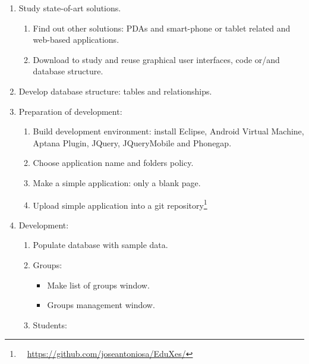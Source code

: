 \documentclass[a4paper]{article}
\begin{document}
\begin{enumerate}
\item Study state-of-art solutions. 

\begin{enumerate}
\item Find out other solutions: PDAs and smart-phone or tablet related
and web-based applications.
\item Download to study and reuse graphical user interfaces, code or/and
database structure. 
\end{enumerate}
\item Develop database structure: tables and relationships. 
\item Preparation of development:

\begin{enumerate}
\item Build development environment: install Eclipse, Android Virtual
Machine, Aptana Plugin, JQuery, JQueryMobile and Phonegap.
\item Choose application name and folder{\textquotesingle}s policy.
\item Make a simple application: only a blank page.
\item Upload simple application into a git
repository\footnote{\ \ \url{https://github.com/joseantoniosa/EduXes/}}
\end{enumerate}
\item Development:

\begin{enumerate}
\item Populate database with sample data.
\item Groups:

\begin{itemize}
\item Make list of groups window.
\item Groups management window.
\end{itemize}
\item Students:


\end{enumerate}
\end{enumerate}
\end{document}
